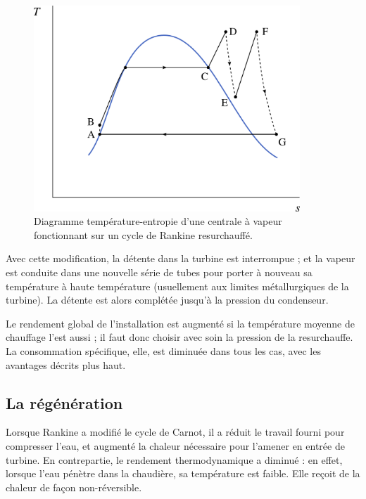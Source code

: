 		\begin{figure}
			\begin{center}
				\includegraphics[width=10cm]{images/ts_lv_rankine_surchauffe_resurchauffe.png}
			\end{center}
			\caption{Diagramme température-entropie d’une centrale à vapeur fonctionnant sur un cycle de Rankine resurchauffé.}
			\label{fig_ts_lv_surchauffe_resurchauffe}
		\end{figure}

		Avec cette modification, la détente dans la turbine est interrompue ; et la vapeur est conduite dans une nouvelle série de tubes pour porter à nouveau sa température à haute température (usuellement aux limites métallurgiques de la turbine). La détente est alors complétée jusqu’à la pression du condenseur.

		Le rendement global de l’installation est augmenté si la température moyenne de chauffage l’est aussi ; il faut donc choisir avec soin la pression de la resurchauffe. La consommation spécifique, elle, est diminuée dans tous les cas, avec les avantages décrits plus haut.



	\subsection{La régénération}
	\label{ch_regeneration}

		Lorsque Rankine a modifié le cycle de Carnot, il a réduit le travail fourni pour compresser l’eau, et augmenté la chaleur nécessaire pour l’amener en entrée de turbine. En contrepartie, le rendement thermodynamique a diminué : en effet, lorsque l’eau pénètre dans la chaudière, sa température est faible. Elle reçoit de la chaleur de façon non-réversible.

